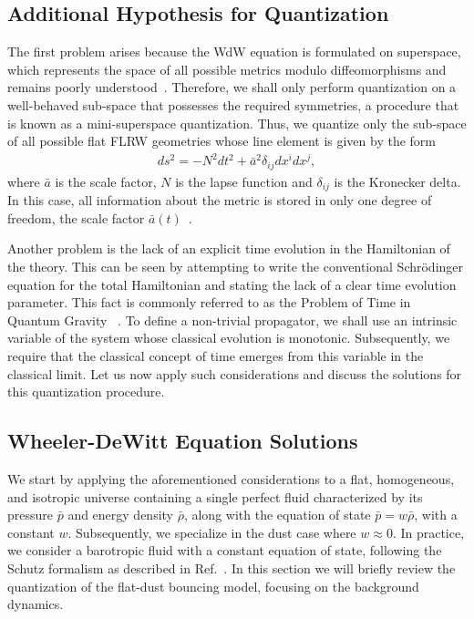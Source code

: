\documentclass[a4paper,11pt]{article}
\begin{document}
\subsection{Additional Hypothesis for Quantization}

The first problem arises because the WdW equation is formulated on superspace, which
represents the space of all possible metrics modulo diffeomorphisms and remains poorly
understood~\cite{halliwell1990introductory,dewitt1967}. Therefore, we shall only perform
quantization on a well-behaved sub-space that possesses the required symmetries, a
procedure that is known as a mini-superspace quantization. Thus, we quantize only the
sub-space of all possible flat FLRW geometries whose line element is given by the form
\begin{align}
	\label{physmetric}
	ds^2 = -N^{2}dt^2 + \bar{a}^2 \delta_{ij}dx^i dx^j
	,\end{align}
where $\bar{a}$ is the scale factor, $N$ is the lapse function and $\delta_{ij}$ is the
Kronecker delta. In this case, all information about the metric is stored in only one
degree of freedom, the scale factor $\bar{a}(t)$~\cite{nelson2021bouncing}.

Another problem is the lack of an explicit time evolution in the Hamiltonian of the
theory. This can be seen by attempting to write the conventional Schrödinger equation
for the total Hamiltonian and stating the lack of a clear time evolution parameter. This
fact is commonly referred to as the Problem of Time in Quantum Gravity ~\cite
{patrick_time_review,nelson_peter_bouncing_original,bianchi_time}. To define a
non-trivial propagator, we shall use an intrinsic variable of the system whose classical
evolution is monotonic. Subsequently, we require that the classical concept of time
emerges from this variable in the classical limit. Let us now apply such considerations
and discuss the solutions for this quantization procedure.

\subsection{Wheeler-DeWitt Equation Solutions}
\label{sec:wdw}

We start by applying the aforementioned considerations to a flat, homogeneous, and
isotropic universe containing a single perfect fluid characterized by its pressure
$\bar{p}$ and energy density $\bar{\rho}$, along with the equation of state $\bar{p} =
	w\bar{\rho}$, with a constant $w$. Subsequently, we specialize in the dust case where $w
	\approx 0$. In practice, we consider a barotropic fluid with a constant equation of
state, following the Schutz formalism as described in Ref.~\cite{fluidgeral}. In this
section we will briefly review the quantization of the flat-dust bouncing model,
focusing on the background dynamics.
\end{document}
